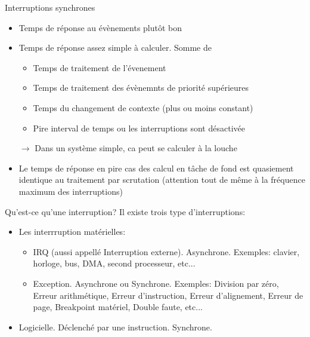 \begin{frame}{Interruptions synchrones}
  \begin{itemize} 
  \item Temps de réponse au évènements plutôt bon
  \item Temps de réponse assez simple à calculer. Somme de 
    \begin{itemize}
    \item Temps de traitement de l'évenement
    \item Temps de traitement des évènemnts de priorité supérieures
    \item Temps du changement de contexte (plus ou moins constant)
    \item Pire interval de temps ou les interruptions sont désactivée 
    \end{itemize} 
  \item[$\rightarrow$] Dans  un système simple, ca peut  se calculer à
    la louche
  \item Le  temps de réponse en pire  cas des calcul en  tâche de fond
    est quasiement  identique au traitement  par scrutation (attention
    tout de même à la fréquence maximum des interruptions)
  \end{itemize} 
\end{frame} 

\begin{frame}{Qu'est-ce qu'une interruption?}
  Il existe trois type d'interruptions:
  \begin{itemize} 
  \item Les interrruption matérielles:
    \begin{itemize} 
    \item        IRQ         (aussi        appellé        Interruption
      externe).  Asynchrone.  Exemples:  clavier, horloge,  bus,  DMA,
      second processeur, etc...
    \item Exception.  Asynchrone ou Synchrone.  Exemples: Division par
      zéro,   Erreur   arithmétique,   Erreur  d'instruction,   Erreur
      d'alignement, Erreur de page, Breakpoint matériel, Double faute,
      etc...
    \end{itemize} 
  \item Logicielle. Déclenché par une instruction. Synchrone.
  \end{itemize}
\end{frame} 


